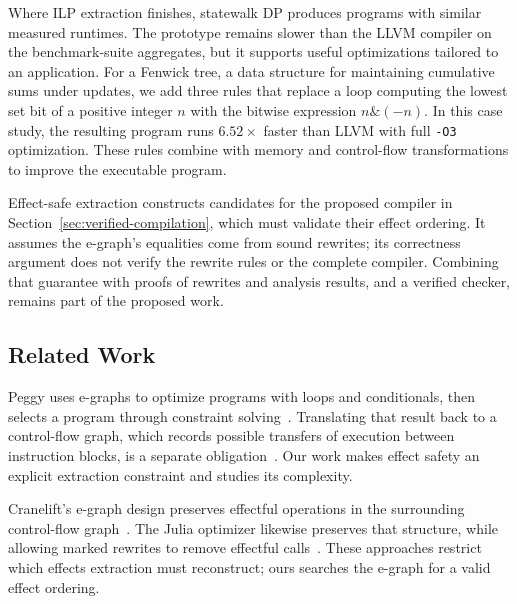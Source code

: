 Where ILP extraction finishes, statewalk DP produces programs with similar measured runtimes.
The prototype remains slower than the LLVM compiler on the benchmark-suite aggregates,
  but it supports useful optimizations tailored to an application.
For a Fenwick tree, a data structure for maintaining cumulative sums under updates,
  we add three rules that replace a loop computing the lowest set bit of a positive integer $n$
  with the bitwise expression $n\mathbin{\&}(-n)$.
In this case study, the resulting program runs $6.52\times$ faster than LLVM with full
  \texttt{-O3} optimization.
These rules combine with memory and control-flow transformations to improve the executable program.

Effect-safe extraction constructs candidates for the proposed compiler
  in Section~\ref{sec:verified-compilation}, which must validate their effect ordering.
It assumes the e-graph's equalities come from sound rewrites;
  its correctness argument does not verify the rewrite rules or the complete compiler.
Combining that guarantee with proofs of rewrites and analysis results,
  and a verified checker, remains part of the proposed work.

\subsection{Related Work}
\label{sec:related-effects}

Peggy uses e-graphs to optimize programs with loops and conditionals,
  then selects a program through constraint solving~\cite{peggy}.
Translating that result back to a control-flow graph, which records possible transfers
  of execution between instruction blocks, is a separate obligation~\cite{peg-cfg}.
Our work makes effect safety an explicit extraction constraint and studies its complexity.

Cranelift's e-graph design preserves effectful operations in the surrounding control-flow graph~\cite{aegraph}.
The Julia optimizer likewise preserves that structure, while allowing marked rewrites to remove effectful calls~\cite{eqsat-julia}.
These approaches restrict which effects extraction must reconstruct;
  ours searches the e-graph for a valid effect ordering.

